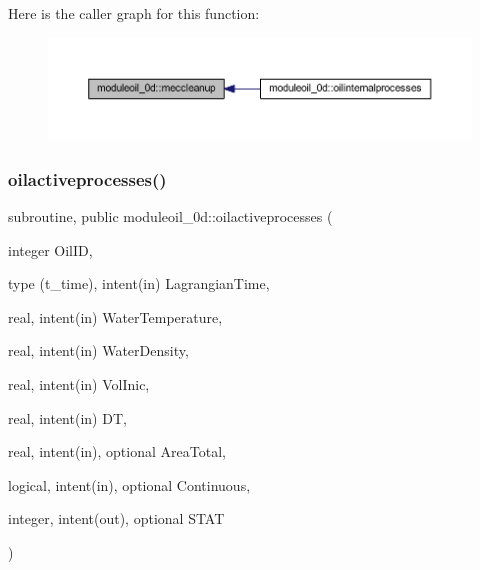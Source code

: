 Here is the caller graph for this function\+:\nopagebreak
\begin{figure}[H]
\begin{center}
\leavevmode
\includegraphics[width=350pt]{namespacemoduleoil__0d_a44f803669a7c3e8a5a116008eb987343_icgraph}
\end{center}
\end{figure}
\mbox{\label{namespacemoduleoil__0d_a555da7465f065b530285f2a3661690f9}} 
\subsubsection{\texorpdfstring{oilactiveprocesses()}{oilactiveprocesses()}}
{\footnotesize\ttfamily subroutine, public moduleoil\+\_\+0d\+::oilactiveprocesses (\begin{DoxyParamCaption}\item[{integer}]{Oil\+ID,  }\item[{type (t\+\_\+time), intent(in)}]{Lagrangian\+Time,  }\item[{real, intent(in)}]{Water\+Temperature,  }\item[{real, intent(in)}]{Water\+Density,  }\item[{real, intent(in)}]{Vol\+Inic,  }\item[{real, intent(in)}]{DT,  }\item[{real, intent(in), optional}]{Area\+Total,  }\item[{logical, intent(in), optional}]{Continuous,  }\item[{integer, intent(out), optional}]{S\+T\+AT }\end{DoxyParamCaption})}


